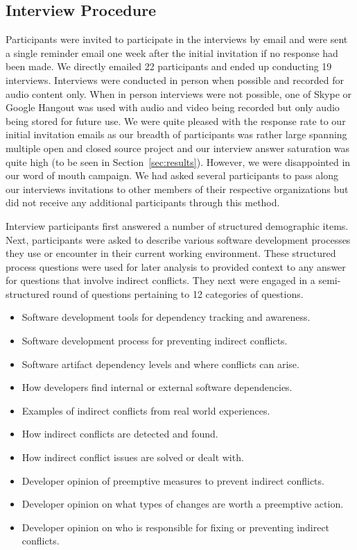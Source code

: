 \documentclass[conference]{IEEEtran}
\begin{document}
\subsection{Interview Procedure}

Participants were invited to participate in the interviews by email and were sent a single reminder email one week
after the initial invitation if no response had been made. We directly emailed 22 participants and ended up conducting
19 interviews. Interviews were conducted in person when possible and recorded for audio content only. When in person
interviews were not possible, one of Skype or Google Hangout was used with audio and video being recorded but only
audio being stored for future use. We were quite pleased with the response rate to our initial invitation emails as
our breadth of participants was rather large spanning multiple open and closed source project and our interview 
answer saturation was quite high (to be seen in Section~\ref{sec:results}). However, we were disappointed in our word
of mouth campaign. We had asked several participants to pass along our interviews invitations to other members of
their respective organizations but did not receive any additional participants through this method.

Interview participants first answered a number of structured demographic items. Next, participants were 
asked to describe various software development processes they use or encounter in their current working
environment. These structured process questions were used for later analysis to provided context to
any answer for questions that involve indirect conflicts. They next were engaged in a
semi-structured round of questions pertaining to 12 categories of questions. 

\begin{itemize}
\item Software development tools for dependency tracking and awareness.
\item Software development process for preventing indirect conflicts.
\item Software artifact dependency levels and where conflicts can arise.
\item How developers find internal or external software dependencies.
\item Examples of indirect conflicts from real world experiences.
\item How indirect conflicts are detected and found.
\item How indirect conflict issues are solved or dealt with.
\item Developer opinion of preemptive measures to prevent indirect conflicts.
\item Developer opinion on what types of changes are worth a preemptive action.
\item Developer opinion on who is responsible for fixing or preventing indirect conflicts.
\end{itemize}
\end{document}
